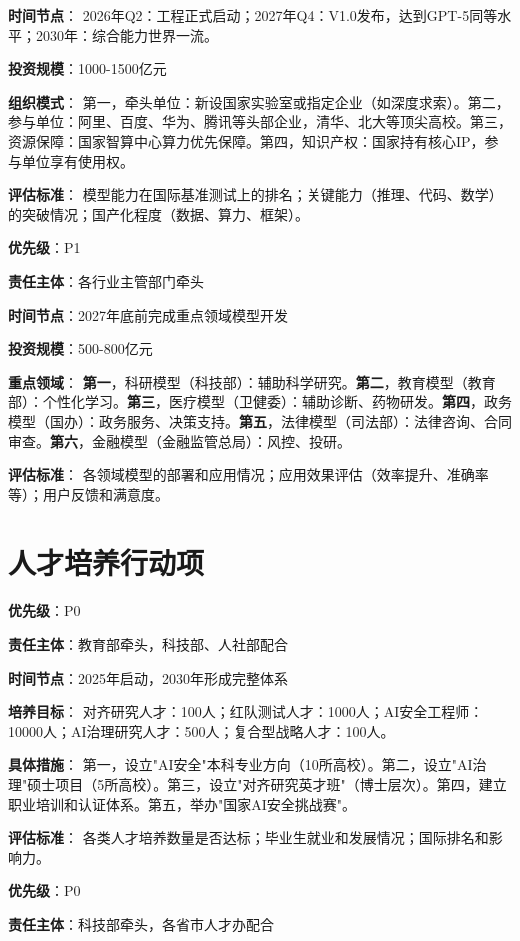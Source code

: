 \textbf{时间节点}：
2026年Q2：工程正式启动；2027年Q4：V1.0发布，达到GPT-5同等水平；2030年：综合能力世界一流。

\textbf{投资规模}：1000-1500亿元

\textbf{组织模式}：
第一，牵头单位：新设国家实验室或指定企业（如深度求索）。第二，参与单位：阿里、百度、华为、腾讯等头部企业，清华、北大等顶尖高校。第三，资源保障：国家智算中心算力优先保障。第四，知识产权：国家持有核心IP，参与单位享有使用权。

\textbf{评估标准}：
模型能力在国际基准测试上的排名；关键能力（推理、代码、数学）的突破情况；国产化程度（数据、算力、框架）。

\textbf{优先级}：P1

\textbf{责任主体}：各行业主管部门牵头

\textbf{时间节点}：2027年底前完成重点领域模型开发

\textbf{投资规模}：500-800亿元

\textbf{重点领域}：
\textbf{第一}，科研模型（科技部）：辅助科学研究。\textbf{第二}，教育模型（教育部）：个性化学习。\textbf{第三}，医疗模型（卫健委）：辅助诊断、药物研发。\textbf{第四}，政务模型（国办）：政务服务、决策支持。\textbf{第五}，法律模型（司法部）：法律咨询、合同审查。\textbf{第六}，金融模型（金融监管总局）：风控、投研。

\textbf{评估标准}：
各领域模型的部署和应用情况；应用效果评估（效率提升、准确率等）；用户反馈和满意度。

\section{人才培养行动项}

\textbf{优先级}：P0

\textbf{责任主体}：教育部牵头，科技部、人社部配合

\textbf{时间节点}：2025年启动，2030年形成完整体系

\textbf{培养目标}：
对齐研究人才：100人；红队测试人才：1000人；AI安全工程师：10000人；AI治理研究人才：500人；复合型战略人才：100人。

\textbf{具体措施}：
第一，设立"AI安全"本科专业方向（10所高校）。第二，设立"AI治理"硕士项目（5所高校）。第三，设立"对齐研究英才班"（博士层次）。第四，建立职业培训和认证体系。第五，举办"国家AI安全挑战赛"。

\textbf{评估标准}：
各类人才培养数量是否达标；毕业生就业和发展情况；国际排名和影响力。

\textbf{优先级}：P0

\textbf{责任主体}：科技部牵头，各省市人才办配合

